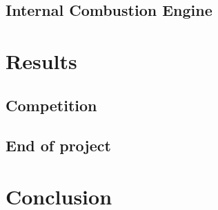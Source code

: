 \subsection{Internal Combustion Engine}

\section{Results}
\subsection{Competition}

\subsection{End of project}

\section{Conclusion}